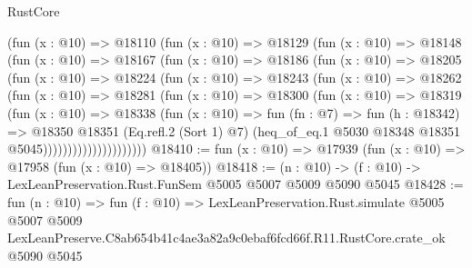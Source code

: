 \begin{lexlean}{RustCore}
\begin{coremodule}
                (fun (x : @10) =>
                @18110
                  (fun (x : @10) =>
                  @18129
                    (fun (x : @10) =>
                    @18148
                      (fun (x : @10) =>
                      @18167
                        (fun (x : @10) =>
                        @18186
                          (fun (x : @10) =>
                          @18205
                            (fun (x : @10) =>
                            @18224
                              (fun (x : @10) =>
                              @18243
                                (fun (x : @10) =>
                                @18262
                                  (fun (x : @10) =>
                                  @18281
                                    (fun (x : @10) =>
                                    @18300
                                      (fun (x : @10) =>
                                      @18319
                                        (fun (x : @10) =>
                                        @18338
                                          (fun (x : @10) =>
                                          fun (fn : @7) =>
                                          fun (h : @18342) =>
                                          @18350
                                            @18351
                                            (Eq.refl.{2} (Sort 1) @7)
                                            (heq_of_eq.{1}
                                              @5030
                                              @18348
                                              @18351
                                              @5045)))))))))))))))))))))
@18410 := fun (x : @10) => @17939 (fun (x : @10) => @17958 (fun (x : @10) => @18405))
@18418 := (n : @10) -> (f : @10) -> LexLeanPreservation.Rust.FunSem @5005 @5007 @5009 @5090 @5045
@18428 := fun (n : @10) =>
  fun (f : @10) =>
  LexLeanPreservation.Rust.simulate
    @5005
    @5007
    @5009
    LexLeanPreserve.C8ab654b41c4ae3a82a9c0ebaf6fcd66f.R11.RustCore.crate_ok
    @5090
    @5045
\end{coremodule}
\end{lexlean}
